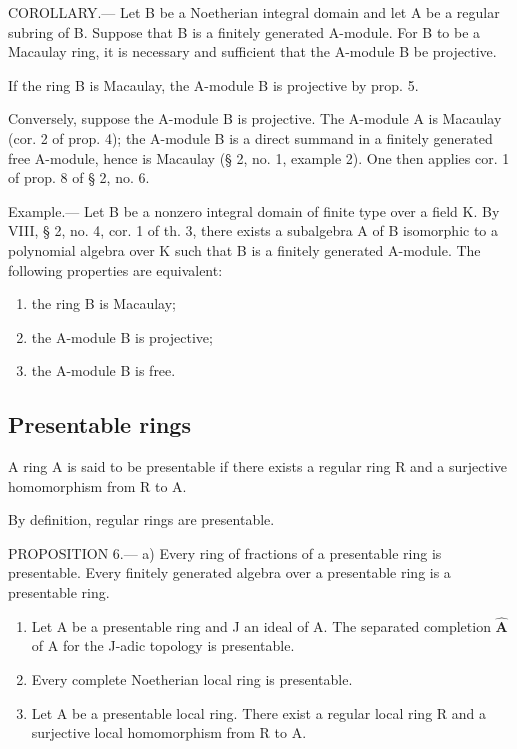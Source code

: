 COROLLARY.--- Let B be a Noetherian integral domain and let A be a regular subring of B. Suppose that B is a finitely generated A-module. For B to be a Macaulay ring, it is necessary and sufficient that the A-module B be projective.

If the ring B is Macaulay, the A-module B is projective by prop. 5.

Conversely, suppose the A-module B is projective. The A-module A is Macaulay (cor. 2 of prop. 4); the A-module B is a direct summand in a finitely generated free A-module, hence is Macaulay (§ 2, no. 1, example 2). One then applies cor. 1 of prop. 8 of § 2, no. 6.

Example.--- Let B be a nonzero integral domain of finite type over a field K. By VIII, § 2, no. 4, cor. 1 of th. 3, there exists a subalgebra A of B isomorphic to a polynomial algebra over K such that B is a finitely generated A-module. The following properties are equivalent:

\begin{enumerate}
\def\labelenumi{(\roman{enumi})}
\item
  the ring B is Macaulay;
\item
  the A-module B is projective;
\item
  the A-module B is free.
\end{enumerate}

\subsection{Presentable rings}

A ring A is said to be presentable if there exists a regular ring R and a surjective homomorphism from R to A.

By definition, regular rings are presentable.

PROPOSITION 6.--- a) Every ring of fractions of a presentable ring is presentable. Every finitely generated algebra over a presentable ring is a presentable ring.

\begin{enumerate}
\def\labelenumi{\alph{enumi})}
\setcounter{enumi}{1}
\item
  Let A be a presentable ring and J an ideal of A. The separated completion \(\widehat{\mathbf{A}}\) of A for the J-adic topology is presentable.
\item
  Every complete Noetherian local ring is presentable.
\item
  Let A be a presentable local ring. There exist a regular local ring R and a surjective local homomorphism from R to A.
\end{enumerate}

